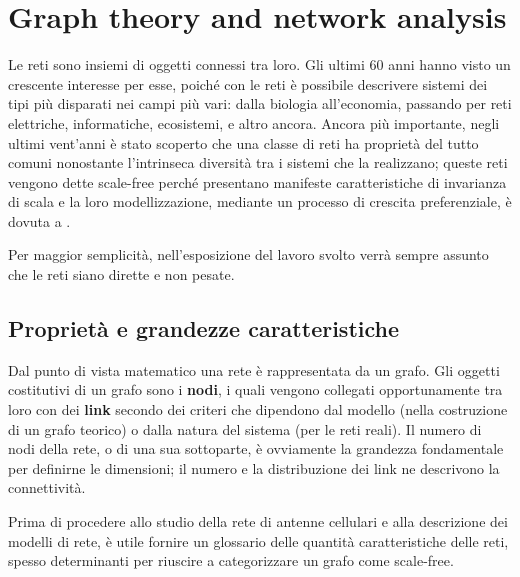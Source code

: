 \clearpage
\section{Graph theory and network analysis}
\label{sec:teoria}
Le reti sono insiemi di oggetti connessi tra loro. Gli ultimi 60 anni hanno visto un crescente interesse per esse, poiché con le reti è possibile descrivere sistemi dei tipi più disparati nei campi più vari: dalla biologia all'economia, passando per reti elettriche, informatiche, ecosistemi, e altro ancora. Ancora più importante, negli ultimi vent'anni è stato scoperto che una classe di reti ha proprietà del tutto comuni nonostante l'intrinseca diversità tra i sistemi che la realizzano; queste reti vengono dette scale-free perché presentano manifeste caratteristiche di invarianza di scala e la loro modellizzazione, mediante un processo di crescita preferenziale, è dovuta a \textcite{Barbalbert1999}.

Per maggior semplicità, nell'esposizione del lavoro svolto verrà sempre assunto che le reti siano dirette e non pesate.

\subsection{Proprietà e grandezze caratteristiche}
Dal punto di vista matematico una rete è rappresentata da un grafo. Gli oggetti costitutivi di un grafo sono i \textbf{nodi}, i quali vengono collegati opportunamente tra loro con dei \textbf{link} secondo dei criteri che dipendono dal modello (nella costruzione di un grafo teorico) o dalla natura del sistema (per le reti reali). Il numero di nodi della rete, o di una sua sottoparte, è ovviamente la grandezza fondamentale per definirne le dimensioni; il numero e la distribuzione dei link ne descrivono la connettività.

Prima di procedere allo studio della rete di antenne cellulari e alla descrizione dei modelli di rete, è utile fornire un glossario delle quantità caratteristiche delle reti, spesso determinanti per riuscire a categorizzare un grafo come scale-free.

